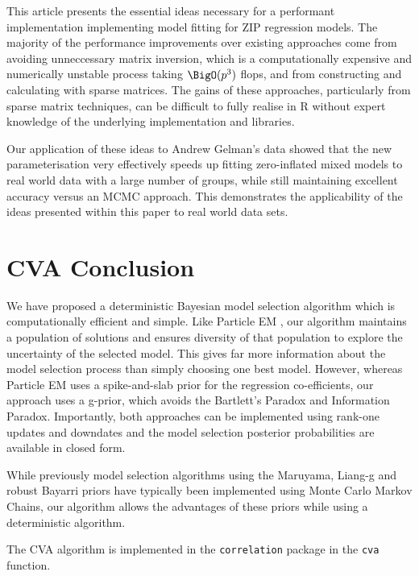 This article presents the essential ideas necessary for a performant implementation implementing model fitting
for ZIP regression models.%
The majority of the performance
improvements over existing approaches come from avoiding unneccessary matrix inversion, which is a
computationally expensive and numerically unstable process taking $\BigO(p^3)$ flops, and from constructing and 
calculating	with sparse matrices. The gains of these approaches, particularly from sparse matrix techniques, 
can be difficult to fully realise in R without expert knowledge of the underlying implementation and libraries.
		
Our application of these ideas to Andrew Gelman's data showed that the new parameterisation very effectively
speeds up fitting zero-inflated mixed models to real world data with a large number of groups, while still
maintaining excellent accuracy versus an MCMC approach. This demonstrates the applicability of the ideas
presented within this paper to real world data sets.
		
\section{CVA Conclusion}

We have proposed a deterministic Bayesian model selection algorithm which is computationally efficient
and simple. Like Particle EM \cite{Rockova2016}, our algorithm maintains a population of solutions and ensures
diversity of that population to explore the uncertainty of the selected model. This gives far more information
about the model selection process than simply choosing one best model. However, whereas Particle EM uses
a spike-and-slab prior for the regression co-efficients, our approach uses a g-prior, which avoids 
the Bartlett's Paradox and Information Paradox. Importantly, both approaches can be implemented using rank-one
updates and downdates and the model selection posterior probabilities are available in closed form.

While previously model selection algorithms using the Maruyama, Liang-g and robust Bayarri priors have
typically been implemented using Monte Carlo Markov Chains, our algorithm allows the advantages of these
priors while using a deterministic algorithm.

The CVA algorithm is implemented in the {\tt correlation} package in the {\tt cva} function.
